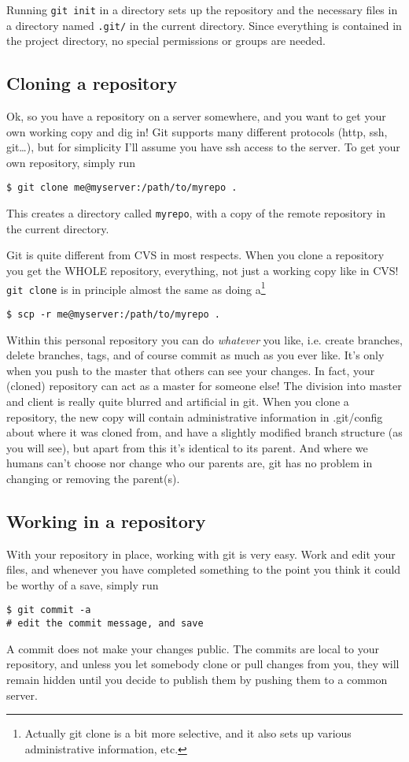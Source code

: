 \documentclass[a4paper,10pt]{article}
\begin{document}
Running \texttt{git init} in a directory sets up the repository and the
necessary files in a directory named \texttt{.git/} in the current directory.
Since everything is contained in the project directory, no special permissions
or groups are needed. 

\subsection{Cloning a repository}
Ok, so you have a repository on a server somewhere, and you want to get your own
working copy and dig in! Git supports many different protocols (http, ssh,
git\ldots), but for simplicity I'll assume you have ssh access to the server.
To get your own repository, simply run
\begin{verbatim}
$ git clone me@myserver:/path/to/myrepo .
\end{verbatim}
This creates a directory called \texttt{myrepo}, with a copy of the remote
repository in the current directory.

Git is quite different from CVS in most respects. When you clone a repository
you get the WHOLE repository, everything, not just a working copy like in CVS!
\texttt{git clone} is in principle almost the same as doing a\footnote{
Actually git clone is a bit more selective, and it also sets up various
administrative information, etc.} 
\begin{verbatim}
$ scp -r me@myserver:/path/to/myrepo .
\end{verbatim}
Within this personal repository you can do \textit{whatever} you like, i.e.
create branches, delete branches, tags, and of course commit as much as you
ever like. It's only when you push to the master that others can see your
changes.  In fact, your (cloned) repository can act as a master for someone
else! The division into master and client is really quite blurred and
artificial in git.  When you clone a repository, the new copy will contain
administrative information in .git/config about where it was cloned from, and
have a slightly modified branch structure (as you will see), but apart from
this it's identical to its parent. And where we humans can't choose nor
change who our parents are, git has no problem in changing or removing the
parent(s).

\subsection{Working in a repository}
With your repository in place, working with git is very easy. Work and edit
your files, and whenever you have completed something to the point you think
it could be worthy of a save, simply run
\begin{verbatim}
$ git commit -a
# edit the commit message, and save
\end{verbatim}
A commit does not make your changes public. The commits are local to your
repository, and unless you let somebody clone or pull changes from you,
they will remain hidden until you decide to publish them by pushing them
to a common server.
\end{document}
